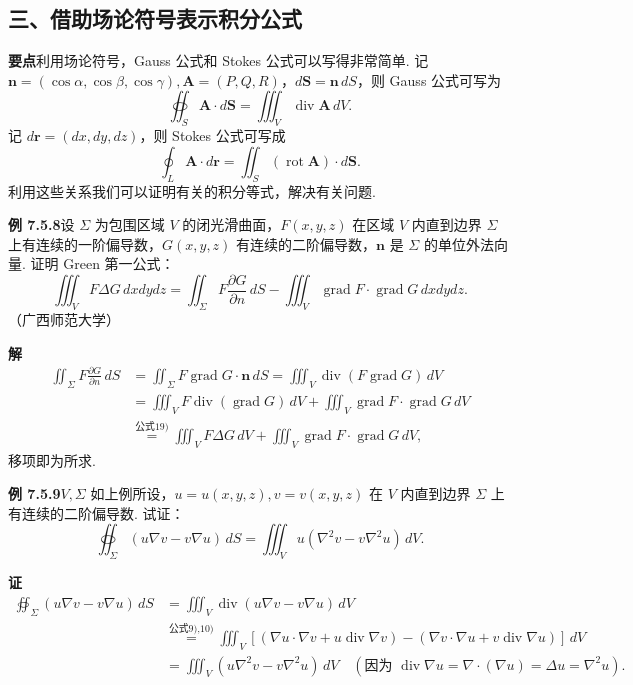 \documentclass[UTF8,12pt,a4paper,fontset=fandol]{ctexart}
\begin{document}
\subsection*{三、借助场论符号表示积分公式}

\noindent\textbf{要点}\quad 利用场论符号，Gauss 公式和 Stokes 公式可以写得非常简单. 记 $\mathbf n=(\cos\alpha,\cos\beta,\cos\gamma),\mathbf A=(P,Q,R)$，$d\mathbf S=\mathbf n\,dS$，则 Gauss 公式可写为
\[
\oiint_S \mathbf A\cdot d\mathbf S=\iiint_V \operatorname{div}\mathbf A\,dV.
\]
记 $d\mathbf r=(dx,dy,dz)$，则 Stokes 公式可写成
\[
\oint_L \mathbf A\cdot d\mathbf r=\iint_S(\operatorname{rot}\mathbf A)\cdot d\mathbf S.
\]
利用这些关系我们可以证明有关的积分等式，解决有关问题.

\noindent\textbf{例 7.5.8}\quad 设 $\Sigma$ 为包围区域 $V$ 的闭光滑曲面，$F(x,y,z)$ 在区域 $V$ 内直到边界 $\Sigma$ 上有连续的一阶偏导数，$G(x,y,z)$ 有连续的二阶偏导数，$\mathbf n$ 是 $\Sigma$ 的单位外法向量. 证明 Green 第一公式：
\[
\iiint_V F\Delta G\,dxdy dz=\iint_\Sigma F\frac{\partial G}{\partial n}\,dS-\iiint_V \operatorname{grad}F\cdot\operatorname{grad}G\,dxdy dz.
\]
（广西师范大学）

\noindent\textbf{解}\quad
\[
\begin{aligned}
\iint_\Sigma F\frac{\partial G}{\partial n}\,dS
&=\iint_\Sigma F\operatorname{grad}G\cdot\mathbf n\,dS
=\iiint_V\operatorname{div}(F\operatorname{grad}G)\,dV\\
&=\iiint_V F\operatorname{div}(\operatorname{grad}G)\,dV+\iiint_V\operatorname{grad}F\cdot\operatorname{grad}G\,dV\\
&\overset{\text{公式19)}}{=}\iiint_V F\Delta G\,dV+\iiint_V\operatorname{grad}F\cdot\operatorname{grad}G\,dV,
\end{aligned}
\]
移项即为所求.

\noindent\textbf{例 7.5.9}\quad $V,\Sigma$ 如上例所设，$u=u(x,y,z),v=v(x,y,z)$ 在 $V$ 内直到边界 $\Sigma$ 上有连续的二阶偏导数. 试证：
\[
\oiint_\Sigma(u\nabla v-v\nabla u)\,dS=\iiint_V u(\nabla^2v-v\nabla^2u)\,dV.
\]

\noindent\textbf{证}\quad
\[
\begin{aligned}
\oiint_\Sigma(u\nabla v-v\nabla u)\,dS
&=\iiint_V \operatorname{div}(u\nabla v-v\nabla u)\,dV\\
&\overset{\text{公式9),10)}}{=}\iiint_V\left[(\nabla u\cdot\nabla v+u\operatorname{div}\nabla v)-(\nabla v\cdot\nabla u+v\operatorname{div}\nabla u)\right]\,dV\\
&=\iiint_V(u\nabla^2v-v\nabla^2u)\,dV
\quad(\text{因为 }\operatorname{div}\nabla u=\nabla\cdot(\nabla u)=\Delta u=\nabla^2u).
\end{aligned}
\]
\end{document}
